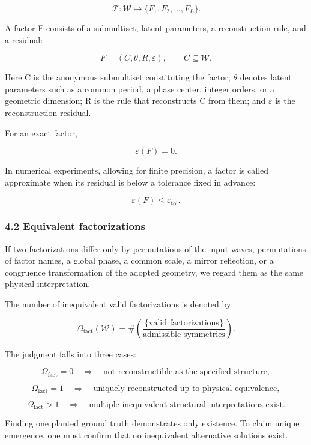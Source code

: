 \documentclass[
  a4paper,
]{article}
\begin{document}
\[
\mathcal F:
\mathcal W
\longmapsto
\{F_1,F_2,\ldots,F_L\}.
\]

A factor F consists of a submultiset, latent parameters, a
reconstruction rule, and a residual:

\[
F
=
(C,\theta,R,\varepsilon),
\qquad
C\subseteq\mathcal W.
\]

Here C is the anonymous submultiset constituting the factor; \(\theta\)
denotes latent parameters such as a common period, a phase center,
integer orders, or a geometric dimension; R is the rule that
reconstructs C from them; and \(\varepsilon\) is the reconstruction
residual.

For an exact factor,

\[
\varepsilon(F)=0.
\]

In numerical experiments, allowing for finite precision, a factor is
called approximate when its residual is below a tolerance fixed in
advance:

\[
\varepsilon(F)\leq\varepsilon_{\mathrm{tol}}.
\]

\subsubsection{4.2 Equivalent
factorizations}\label{equivalent-factorizations}

If two factorizations differ only by permutations of the input waves,
permutations of factor names, a global phase, a common scale, a mirror
reflection, or a congruence transformation of the adopted geometry, we
regard them as the same physical interpretation.

The number of inequivalent valid factorizations is denoted by

\[
\Omega_{\mathrm{fact}}(\mathcal W)
=
\#\left(
\frac{\{\text{valid factorizations}\}}
{\text{admissible symmetries}}
\right).
\]

The judgment falls into three cases:

\[
\Omega_{\mathrm{fact}}=0
\quad\Longrightarrow\quad
\text{not reconstructible as the specified structure},
\]

\[
\Omega_{\mathrm{fact}}=1
\quad\Longrightarrow\quad
\text{uniquely reconstructed up to physical equivalence},
\]

\[
\Omega_{\mathrm{fact}}>1
\quad\Longrightarrow\quad
\text{multiple inequivalent structural interpretations exist}.
\]

Finding one planted ground truth demonstrates only existence. To claim
unique emergence, one must confirm that no inequivalent alternative
solutions exist.
\end{document}
